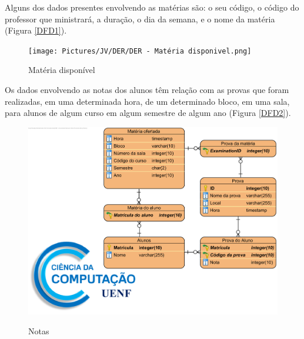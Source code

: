             Alguns dos dados presentes envolvendo as matérias são: o seu código, o código do professor que ministrará, a duração, o dia da semana, e o nome da matéria (Figura \ref{DFD1}).
            \begin{figure}[htbp]\centering
                \caption{Matéria disponível}
                \texttt{[image: Pictures/JV/DER/DER - Matéria disponivel.png]}
                \label{DER1}
            \end{figure}    %
            
            Os dados envolvendo as notas dos alunos têm relação com as provas que foram realizadas, em uma determinada hora, de um determinado bloco, em uma sala, para alunos de algum curso em algum semestre de algum ano (Figura \ref{DFD2}).
            \begin{figure}[htbp]\centering
                \caption{Notas}
                \includegraphics[scale=0.7]{Pictures/JV/DER/DER - Notas.png}
                \label{DER2}
            \end{figure}    %
            
